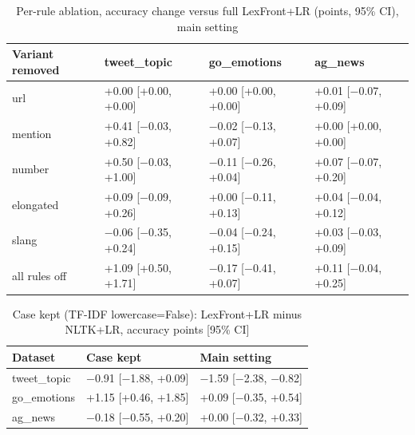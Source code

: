 \documentclass[journal,a4paper]{IEEEtran}
\begin{document}
\begin{table}[!tb]
\caption{Per-rule ablation, accuracy change versus full LexFront+LR (points, 95\% CI), main setting}\label{tab:6}
\centering
\scriptsize
\setlength{\tabcolsep}{3pt}
\begin{tabular}{llll}
\toprule
\textbf{Variant removed} & \textbf{tweet\_topic} & \textbf{go\_emotions} & \textbf{ag\_news} \\
\midrule
url & +0.00 [+0.00, +0.00] & +0.00 [+0.00, +0.00] & +0.01 [$-$0.07, +0.09] \\
mention & +0.41 [$-$0.03, +0.82] & $-$0.02 [$-$0.13, +0.07] & +0.00 [+0.00, +0.00] \\
number & +0.50 [$-$0.03, +1.00] & $-$0.11 [$-$0.26, +0.04] & +0.07 [$-$0.07, +0.20] \\
elongated & +0.09 [$-$0.09, +0.26] & +0.00 [$-$0.11, +0.13] & +0.04 [$-$0.04, +0.12] \\
slang & $-$0.06 [$-$0.35, +0.24] & $-$0.04 [$-$0.24, +0.15] & +0.03 [$-$0.03, +0.09] \\
all rules off & +1.09 [+0.50, +1.71] & $-$0.17 [$-$0.41, +0.07] & +0.11 [$-$0.04, +0.25] \\
\bottomrule
\end{tabular}
\end{table}

\begin{table}[!t]
\caption{Case kept (TF-IDF lowercase=False): LexFront+LR minus NLTK+LR, accuracy points [95\% CI]}\label{tab:7}
\centering
\footnotesize
\setlength{\tabcolsep}{3pt}
\begin{tabular}{lll}
\toprule
\textbf{Dataset} & \textbf{Case kept} & \textbf{Main setting} \\
\midrule
tweet\_topic & $-$0.91 [$-$1.88, +0.09] & $-$1.59 [$-$2.38, $-$0.82] \\
go\_emotions & +1.15 [+0.46, +1.85] & +0.09 [$-$0.35, +0.54] \\
ag\_news & $-$0.18 [$-$0.55, +0.20] & +0.00 [$-$0.32, +0.33] \\
\bottomrule
\end{tabular}
\end{table}
\end{document}
